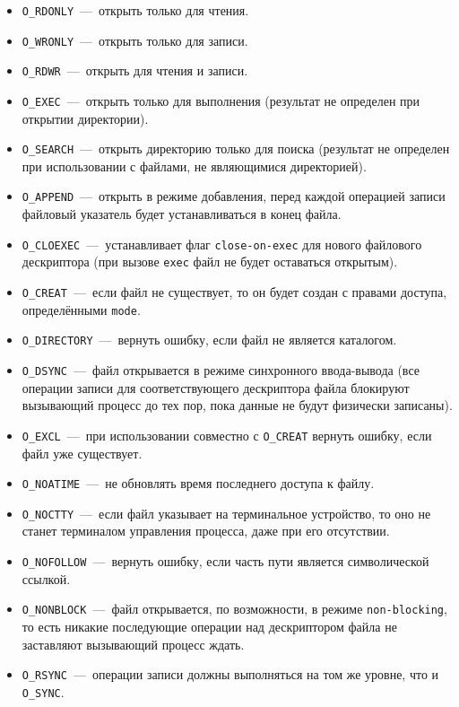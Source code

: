 \begin{itemize}
	\item \texttt{O\_RDONLY}~---~открыть только для чтения.
	\item \texttt{O\_WRONLY}~---~открыть только для записи.
	\item \texttt{O\_RDWR}~---~открыть для чтения и записи.
	\item \texttt{O\_EXEC}~---~открыть только для выполнения (результат не определен при открытии директории).
	\item \texttt{O\_SEARCH}~---~открыть директорию только для поиска (результат не определен при использовании с файлами, не являющимися директорией).
	\item \texttt{O\_APPEND}~---~открыть в режиме добавления, перед каждой операцией записи файловый указатель будет устанавливаться в конец файла.
	\item \texttt{O\_CLOEXEC}~---~устанавливает флаг \texttt{close-on-exec} для нового файлового дескриптора (при вызове \texttt{exec} файл не будет оставаться открытым).
	\item \texttt{O\_CREAT}~---~если файл не существует, то он будет создан с правами доступа, определёнными \texttt{mode}.
	\item \texttt{O\_DIRECTORY}~---~вернуть ошибку, если файл не является каталогом.
	\item \texttt{O\_DSYNC}~---~файл открывается в режиме синхронного ввода-вывода (все операции записи для соответствующего дескриптора файла блокируют вызывающий процесс до тех пор, пока данные не будут физически записаны).
	\item \texttt{O\_EXCL}~---~при использовании совместно с \texttt{O\_CREAT} вернуть ошибку, если файл уже существует.
	\item \texttt{O\_NOATIME}~---~не обновлять время последнего доступа к файлу.
	\item \texttt{O\_NOCTTY}~---~если файл указывает на терминальное устройство, то оно не станет терминалом управления процесса, даже при его отсутствии.
	\item \texttt{O\_NOFOLLOW}~---~вернуть ошибку, если часть пути является символической ссылкой.
	\item \texttt{O\_NONBLOCK}~---~файл открывается, по возможности, в режиме \texttt{non-blocking}, то есть никакие последующие операции над дескриптором файла не заставляют вызывающий процесс ждать.
	\item \texttt{O\_RSYNC}~---~операции записи должны выполняться на том же уровне, что и \texttt{O\_SYNC}.

\end{itemize}
